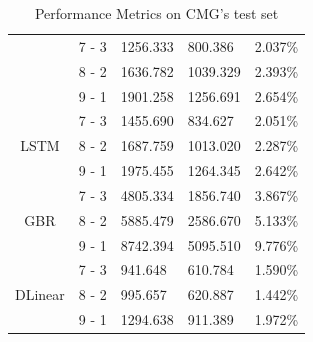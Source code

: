 \documentclass{ieeeojies}
\begin{document}
\begin{table}[H]
\begin{tabular}{|c|c|p{1cm}|p{1cm}|p{1cm}|}
                       & 7 - 3               & 1256.333      & 800.386      & 2.037\%       \\
        \cline{2-5}
                       & 8 - 2               & 1636.782      & 1039.329     & 2.393\%       \\
        \cline{2-5}
                       & 9 - 1               & 1901.258      & 1256.691     & 2.654\%       \\
        \hline
        \multirow{3}{*}{LSTM}
                       & 7 - 3               & 1455.690      & 834.627      & 2.051\%       \\
        \cline{2-5}
                       & 8 - 2               & 1687.759      & 1013.020     & 2.287\%       \\
        \cline{2-5}
                       & 9 - 1               & 1975.455      & 1264.345     & 2.642\%       \\
        \hline
        \multirow{3}{*}{GBR}
                       & 7 - 3               & 4805.334      & 1856.740     & 3.867\%       \\
        \cline{2-5}
                       & 8 - 2               & 5885.479      & 2586.670     & 5.133\%       \\
        \cline{2-5}
                       & 9 - 1               & 8742.394      & 5095.510     & 9.776\%       \\
        \hline
        \multirow{3}{*}{DLinear}
                       & 7 - 3               & 941.648       & 610.784      & 1.590\%       \\
        \cline{2-5}
                       & 8 - 2               & 995.657       & 620.887      & 1.442\%       \\
        \cline{2-5}
                       & 9 - 1               & 1294.638      & 911.389      & 1.972\%       \\
        \hline
    \end{tabular}
    \caption{Performance Metrics on CMG's test set}
    \label{tab:performance_metrics_cmg}
\end{table}
\end{document}
